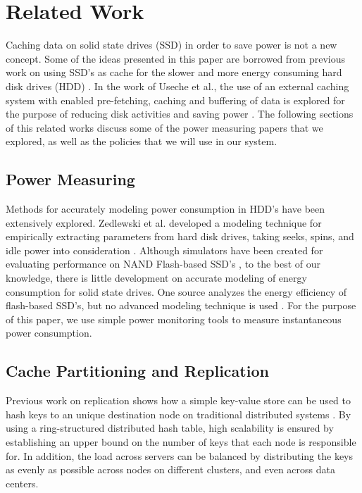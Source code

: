 \section{Related Work}
\label{sec:related}

Caching data on solid state drives (SSD) in order to save power is not a new
concept. Some of the ideas presented in this paper are borrowed from previous
work on using SSD's as cache for the slower and more energy consuming hard disk
drives (HDD) \cite{flash-disk-hybrid}. In the work of Useche et al., the use of
an external caching system with enabled pre-fetching, caching and buffering of
data is explored for the purpose of reducing disk activities and saving power
\cite{extern-cache-energy-saving}. The following sections of this related works
discuss some of the power measuring papers that we explored, as well as the
policies that we will use in our system.

\subsection{Power Measuring}

Methods for accurately modeling power consumption in HDD's have been extensively
explored. Zedlewski et al. developed a modeling technique for empirically
extracting parameters from hard disk drives, taking seeks, spins, and idle power
into consideration \cite{hard-disk-power}. Although simulators have been created
for evaluating performance on NAND Flash-based SSD's \cite{flashsim}, to the best
of our knowledge, there is little development on accurate modeling of energy
consumption for solid state drives. One source analyzes the energy efficiency of
flash-based SSD's, but no advanced modeling technique is used
\cite{ssd-energy-efficiency}. For the purpose of this paper, we use simple power
monitoring tools to measure instantaneous power consumption.

\subsection{Cache Partitioning and Replication}

Previous work on replication shows how a simple key-value store can be used to
hash keys to an unique destination node on traditional distributed systems
\cite{chord} \cite{dynamo}. By using a ring-structured distributed hash table,
high scalability is ensured by establishing an upper bound on the number of keys
that each node is responsible for. In addition, the load across servers can be
balanced by distributing the keys as evenly as possible across nodes on
different clusters, and even across data centers\cite{dynamo}.

